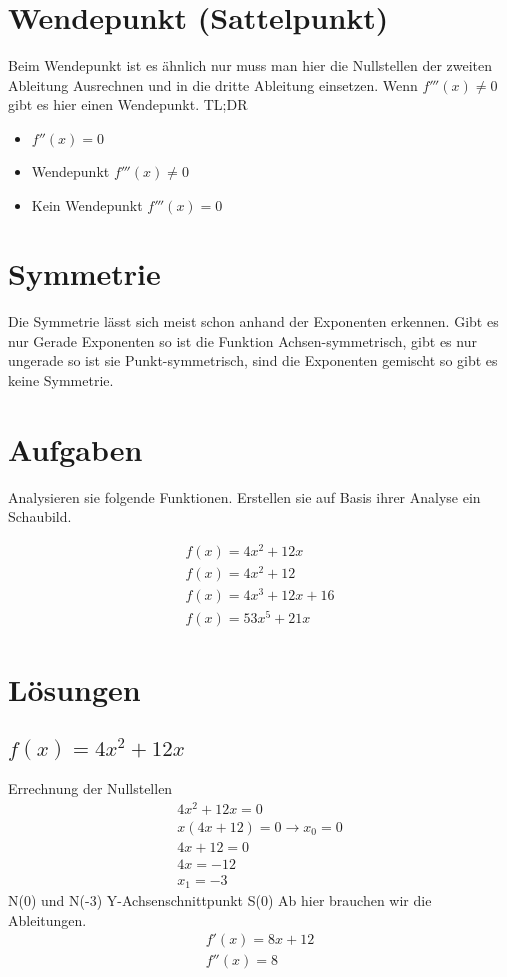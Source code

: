 \documentclass[11pt,a4paper]{article}
\begin{document}
\section{Wendepunkt (Sattelpunkt)}
Beim Wendepunkt ist es ähnlich nur muss man hier die Nullstellen der zweiten Ableitung Ausrechnen und in die dritte Ableitung einsetzen. Wenn $f'''(x) \neq 0$ gibt es hier einen Wendepunkt.
\newline
\newline
TL;DR
\begin{itemize}
\item $f''(x) = 0$
\item Wendepunkt $f'''(x) \neq 0$
\item Kein Wendepunkt $f'''(x) = 0$
\end{itemize}

\section{Symmetrie}
Die Symmetrie lässt sich meist schon anhand der Exponenten erkennen. Gibt es nur Gerade Exponenten so ist die Funktion Achsen-symmetrisch, gibt es nur ungerade so ist sie Punkt-symmetrisch, sind die Exponenten gemischt so gibt es keine Symmetrie.

\newpage

\section{Aufgaben}

Analysieren sie folgende Funktionen. Erstellen sie auf Basis ihrer Analyse ein Schaubild.

\begin{eqnarray}
f(x) = 4x^2 + 12x\\
f(x) = 4x^2 + 12\\
f(x) = 4x^3 + 12x + 16\\
f(x) = 53x^5 + 21x
\end{eqnarray}

\newpage
\section{Lösungen}

\subsection{$f(x) = 4x^2 + 12x$}
Errechnung der Nullstellen
\begin{eqnarray}
4x^2 + 12x = 0\\
x(4x + 12) = 0 \rightarrow x_0 = 0\\
4x + 12 = 0\\
4x = -12\\
x_1 = -3
\end{eqnarray}
N(0) und N(-3) Y-Achsenschnittpunkt S(0)
\newline
Ab hier brauchen wir die Ableitungen.
\begin{eqnarray}
f'(x) = 8x + 12\\
f''(x) = 8
\end{eqnarray}
\end{document}
